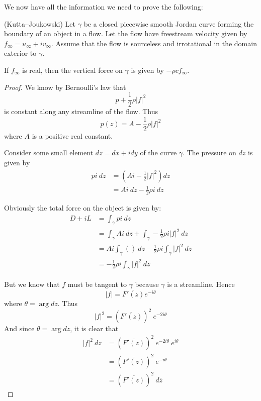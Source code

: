 \documentclass[letterpaper, twoside, 12 pt]{article}
\begin{document}
	We now have all the information we need to prove the following:

	\begin{theorem}(Kutta--Joukowski)
		Let $\gamma$ be a closed piecewise smooth Jordan curve forming the boundary of an object in a flow.
		Let the flow have freestream velocity given by $f_\infty = u_\infty + i v_\infty$.
		Assume that the flow is sourceless and irrotational in the domain exterior to $\gamma$.

		If $f_\infty$ is real, then the vertical force on $\gamma$ is given by $-\rho c f_\infty$.
	\end{theorem}
	\begin{proof}
		We know by Bernoulli's law that 
		\[
			p + \frac{1}{2} \rho |f|^2
		\]
		is constant along any streamline of the flow.
		Thus
		\[
			p(z) = A - \frac{1}{2} \rho |f|^2
		\]
		where $A$ is a positive real constant.

		Consider some small element $dz = dx + i dy$ of the curve $\gamma$.
		The pressure on $dz$ is given by 
		\begin{align*}
			p i \> dz &= \left(  A i - \frac{1}{2} |f|^2 \right) dz \\
			&= Ai \> dz - \frac{1}{2} \rho i \> dz
		\end{align*}
		
		Obviously the total force on the object is given by:
		\begin{align*}
			D + iL &= \int_\gamma p i \ dz  \\
			&= \int_\gamma Ai \ dz + \int_\gamma -\frac{1}{2} \rho i |f|^2 \ dz \\
			&= Ai \int_\gamma () \ dz - \frac{1}{2} \rho i \int_\gamma |f|^2 \ dz \\
			&= - \frac{1}{2} \rho i \int_\gamma |f|^2 \ dz
		\end{align*}

		But we know that $f$ must be tangent to $\gamma$ because $\gamma$ is a streamline.
		Hence
		\[
			|f| = \overline{F'(z)} e^{-i \theta}
		\]
		where $\theta = \arg dz$.
		Thus
		\[
			|f|^2 = \left( \overline{F'(z)} \right)^2 \> e^{-2i \theta}
		\]
		And since $\theta = \arg dz$, it is clear that 
		\begin{align*}
			|f|^2 \ dz &= \left( \overline{F'(z)} \right)^2 \> e^{-2i \theta} \> e^{i \theta} \\
			&= \left( \overline{F'(z)} \right)^2 \> e^{-i \theta} \\
			&= \left( \overline{F'(z)} \right)^2 \ d \bar z
		\end{align*}
		

\end{proof}
\end{document}
